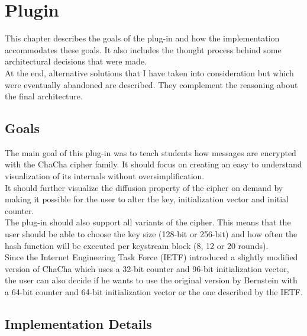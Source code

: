 
\chapter{Plugin}
\label{chap:Plugin}

This chapter describes the goals of the plug-in and how the implementation accommodates these goals. It also includes the thought process behind some architectural decisions that were made.\\ At the end, alternative solutions that I have taken into consideration but which were eventually abandoned are described. They complement the reasoning about the final architecture.

\section{Goals}
\label{sec:goals}

The main goal of this plug-in was to teach students how messages are encrypted with the ChaCha cipher family. It should focus on creating an easy to understand visualization of its internals without oversimplification.\\
It should further visualize the diffusion property of the cipher on demand by making it possible for the user to alter the key, initialization vector and initial counter.\\
The plug-in should also support all variants of the cipher. This means that the user should be able to choose the key size (128-bit or 256-bit) and how often the hash function will be executed per keystream block (8, 12 or 20 rounds).\\
Since the Internet Engineering Task Force (IETF) introduced a slightly modified version of ChaCha which uses a 32-bit counter and 96-bit initialization vector, the user can also decide if he wants to use the original version by Bernstein with a 64-bit counter and 64-bit initialization vector or the one described by the IETF.

\section{Implementation Details}
\label{sec:implementationDetails}

